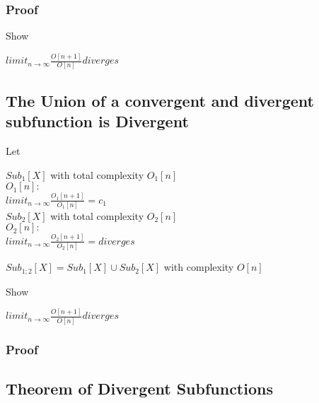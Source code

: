 \documentclass[11pt]{article}
\begin{document}
\subsubsection{Proof}
Show
\begin{center}
$
limit_{n \rightarrow \infty}\frac{O[n+1]}{O[n]} diverges
$
\end{center}




\subsection{The Union of a convergent and divergent subfunction is Divergent}
Let
\begin{center}
$
Sub_1[X]$ with total complexity $O_1[n]$
\\ \vspace{2mm}
$
O_1[n]:
$
\\ \vspace{2mm}
$
limit_{n \rightarrow \infty}\frac{O_1[n+1]}{O_1[n]} = c_1
$
\\ \vspace{6mm}
$
Sub_2[X]$ with total complexity $O_2[n]$
\\ \vspace{2mm}
$
O_2[n]:
$
\\ \vspace{2mm}
$
limit_{n \rightarrow \infty}\frac{O_2[n+1]}{O_2[n]} = diverges
$
\end{center}
\vspace{1mm}
\begin{center}
$
Sub_{1;2}[X] = Sub_1[X] \cup Sub_2[X]$ with complexity $O[n]$
\end{center}
\vspace{2mm}
Show
\begin{center}
$
limit_{n \rightarrow \infty}\frac{O[n+1]}{O[n]} diverges
$
\end{center}
\subsubsection{Proof}







\subsection{Theorem of Divergent Subfunctions}


\end{document}
